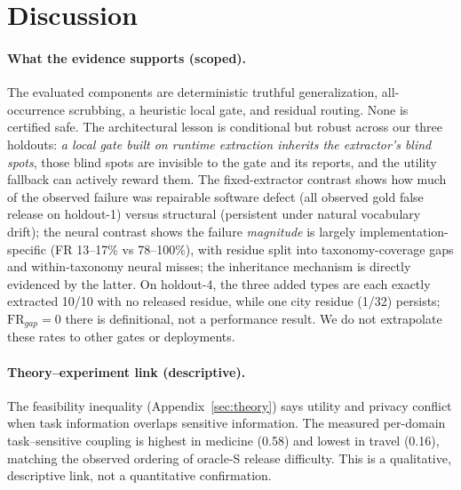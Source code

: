 \documentclass[journal]{IEEEtran}
\begin{document}
\section{Discussion}

\paragraph{What the evidence supports (scoped).} The evaluated components are deterministic truthful generalization, all-occurrence scrubbing, a heuristic local gate, and residual routing. None is certified safe. The architectural lesson is conditional but robust across our three holdouts: \emph{a local gate built on runtime extraction inherits the extractor's blind spots}, those blind spots are invisible to the gate and its reports, and the utility fallback can actively reward them. The fixed-extractor contrast shows how much of the observed failure was repairable software defect (all observed gold false release on holdout-1) versus structural (persistent under natural vocabulary drift); the neural contrast shows the failure \emph{magnitude} is largely implementation-specific (FR 13--17\% vs 78--100\%), with residue split into taxonomy-coverage gaps and within-taxonomy neural misses; the inheritance mechanism is directly evidenced by the latter. On holdout-4, the three added types are each exactly extracted 10/10 with no released residue, while one city residue (1/32) persists; $\mathrm{FR}_{gap}=0$ there is definitional, not a performance result. We do not extrapolate these rates to other gates or deployments.

\paragraph{Theory--experiment link (descriptive).} The feasibility inequality (Appendix~\ref{sec:theory}) says utility and privacy conflict when task information overlaps sensitive information. The measured per-domain task--sensitive coupling is highest in medicine (0.58) and lowest in travel (0.16), matching the observed ordering of oracle-S release difficulty. This is a qualitative, descriptive link, not a quantitative confirmation.
\end{document}

